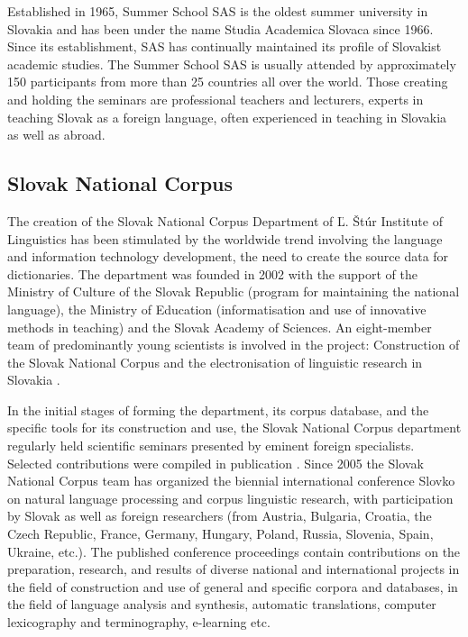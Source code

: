 \begin{multicols}{2}

Established in 1965, Summer School SAS is the oldest summer university in Slovakia and has been under the name Studia Academica Slovaca since 1966. Since its establishment, SAS has continually maintained its profile of Slovakist academic studies. The Summer School SAS is usually attended by approximately 150 participants from more than 25 countries all over the world. Those creating and holding the seminars are professional teachers and lecturers, experts in teaching Slovak as a foreign language, often experienced in teaching in Slovakia as well as abroad.

\subsection{Slovak National Corpus}
The creation of the Slovak National Corpus Department of Ľ. Štúr
Institute of Linguistics has been stimulated by the worldwide trend
involving the language and information technology development, the need
to create the source data for dictionaries. The department was founded
in 2002 with the support of the Ministry of Culture of the Slovak
Republic (program for maintaining the national language), the Ministry
of Education (informatisation and use of innovative  methods in
teaching) and the Slovak Academy of Sciences. An eight-member team of
predominantly young scientists is involved in the project: Construction
of the Slovak National Corpus and the electronisation of linguistic
research in Slovakia \cite{simkova2006b}.

In the initial stages of forming the department, its corpus database,
and the specific tools for its construction and use, the Slovak National
Corpus department regularly held scientific seminars presented by
eminent foreign specialists. Selected contributions were compiled in
publication \cite{simkova2006a}. Since 2005 the Slovak National Corpus
team has organized the biennial international conference Slovko\cite{f10} on
natural language processing and corpus linguistic research, with
participation by Slovak as well as foreign researchers (from Austria,
Bulgaria, Croatia, the Czech Republic, France, Germany, Hungary, Poland,
Russia, Slovenia, Spain, Ukraine, etc.). The published conference
proceedings contain contributions on the preparation, research, and
results of diverse national and international projects in the field of
construction and use of general and specific corpora and databases, in
the field of language analysis and synthesis, automatic translations,
computer lexicography and terminography, e-learning etc. 


\end{multicols}
